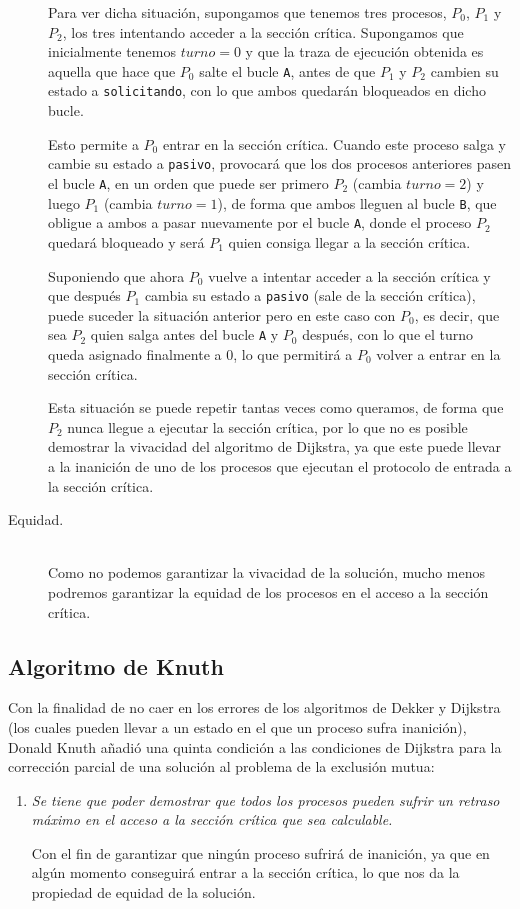 \begin{description}
        Para ver dicha situación, supongamos que tenemos tres procesos, $P_0$, $P_1$ y $P_2$, los tres intentando acceder a la sección crítica. Supongamos que inicialmente tenemos $turno = 0$ y que la traza de ejecución obtenida es aquella que hace que $P_0$ salte el bucle \verb|A|, antes de que $P_1$ y $P_2$ cambien su estado a \verb|solicitando|, con lo que ambos quedarán bloqueados en dicho bucle.

        Esto permite a $P_0$ entrar en la sección crítica. Cuando este proceso salga y cambie su estado a \verb|pasivo|, provocará que los dos procesos anteriores pasen el bucle \verb|A|, en un orden que puede ser primero $P_2$ (cambia $turno = 2$) y luego $P_1$ (cambia $turno = 1$), de forma que ambos lleguen al bucle \verb|B|, que obligue a ambos a pasar nuevamente por el bucle \verb|A|, donde el proceso $P_2$ quedará bloqueado y será $P_1$ quien consiga llegar a la sección crítica.

        Suponiendo que ahora $P_0$ vuelve a intentar acceder a la sección crítica y que después $P_1$ cambia su estado a \verb|pasivo| (sale de la sección crítica), puede suceder la situación anterior pero en este caso con $P_0$, es decir, que sea $P_2$ quien salga antes del bucle \verb|A| y $P_0$ después, con lo que el turno queda asignado finalmente a 0, lo que permitirá a $P_0$ volver a entrar en la sección crítica.

        Esta situación se puede repetir tantas veces como queramos, de forma que $P_2$ nunca llegue a ejecutar la sección crítica, por lo que no es posible demostrar la vivacidad del algoritmo de Dijkstra, ya que este puede llevar a la inanición de uno de los procesos que ejecutan el protocolo de entrada a la sección crítica.
    \item [Equidad.]~\\
        Como no podemos garantizar la vivacidad de la solución, mucho menos podremos garantizar la equidad de los procesos en el acceso a la sección crítica.
\end{description}

\subsection{Algoritmo de Knuth}
Con la finalidad de no caer en los errores de los algoritmos de Dekker y Dijkstra (los cuales pueden llevar a un estado en el que un proceso sufra inanición), Donald Knuth añadió una quinta condición a las condiciones de Dijkstra para la corrección parcial de una solución al problema de la exclusión mutua:
\begin{enumerate}[label=5.]
    \item \textit{Se tiene que poder demostrar que todos los procesos pueden sufrir un retraso máximo en el acceso a la sección crítica que sea calculable.}

        Con el fin de garantizar que ningún proceso sufrirá de inanición, ya que en algún momento conseguirá entrar a la sección crítica, lo que nos da la propiedad de equidad de la solución.
\end{enumerate}

